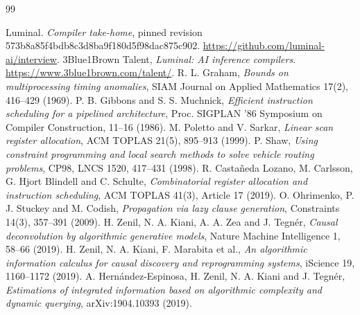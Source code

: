\documentclass[11pt,a4paper]{article}
\begin{document}
\begin{thebibliography}{99}\raggedright\small
{} Luminal. \emph{Compiler take-home}, pinned revision
573b8a85f4bdb8c3d8ba9f180d5f98dac875c902.
\url{https://github.com/luminal-ai/interview}.
 3Blue1Brown Talent, \emph{Luminal: AI inference compilers}.
\url{https://www.3blue1brown.com/talent/}.
 R. L. Graham, \emph{Bounds on multiprocessing timing
anomalies}, SIAM Journal on Applied Mathematics 17(2), 416--429 (1969).
 P. B. Gibbons and S. S. Muchnick, \emph{Efficient
instruction scheduling for a pipelined architecture}, Proc. SIGPLAN '86 Symposium
on Compiler Construction, 11--16 (1986).
 M. Poletto and V. Sarkar, \emph{Linear scan register
allocation}, ACM TOPLAS 21(5), 895--913 (1999).
 P. Shaw, \emph{Using constraint programming and local search
methods to solve vehicle routing problems}, CP98, LNCS 1520, 417--431 (1998).
 R. Casta\~neda Lozano, M. Carlsson, G. Hjort Blindell and
C. Schulte, \emph{Combinatorial register allocation and instruction scheduling},
ACM TOPLAS 41(3), Article 17 (2019).
 O. Ohrimenko, P. J. Stuckey and M. Codish,
\emph{Propagation via lazy clause generation}, Constraints 14(3), 357--391 (2009).
 H. Zenil, N. A. Kiani, A. A. Zea and J. Tegn\'er,
\emph{Causal deconvolution by algorithmic generative models}, Nature Machine
Intelligence 1, 58--66 (2019).
 H. Zenil, N. A. Kiani, F. Marabita et al., \emph{An
algorithmic information calculus for causal discovery and reprogramming systems},
iScience 19, 1160--1172 (2019).
 A. Hern\'andez-Espinosa, H. Zenil, N. A. Kiani and
J. Tegn\'er, \emph{Estimations of integrated information based on algorithmic
complexity and dynamic querying}, arXiv:1904.10393 (2019).
\end{thebibliography}
\end{document}
